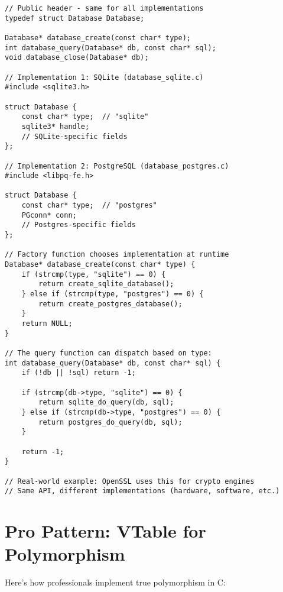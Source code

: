 \begin{lstlisting}
// Public header - same for all implementations
typedef struct Database Database;

Database* database_create(const char* type);
int database_query(Database* db, const char* sql);
void database_close(Database* db);

// Implementation 1: SQLite (database_sqlite.c)
#include <sqlite3.h>

struct Database {
    const char* type;  // "sqlite"
    sqlite3* handle;
    // SQLite-specific fields
};

// Implementation 2: PostgreSQL (database_postgres.c)
#include <libpq-fe.h>

struct Database {
    const char* type;  // "postgres"
    PGconn* conn;
    // Postgres-specific fields
};

// Factory function chooses implementation at runtime
Database* database_create(const char* type) {
    if (strcmp(type, "sqlite") == 0) {
        return create_sqlite_database();
    } else if (strcmp(type, "postgres") == 0) {
        return create_postgres_database();
    }
    return NULL;
}

// The query function can dispatch based on type:
int database_query(Database* db, const char* sql) {
    if (!db || !sql) return -1;

    if (strcmp(db->type, "sqlite") == 0) {
        return sqlite_do_query(db, sql);
    } else if (strcmp(db->type, "postgres") == 0) {
        return postgres_do_query(db, sql);
    }

    return -1;
}

// Real-world example: OpenSSL uses this for crypto engines
// Same API, different implementations (hardware, software, etc.)
\end{lstlisting}

\section{Pro Pattern: VTable for Polymorphism}

Here's how professionals implement true polymorphism in C:


